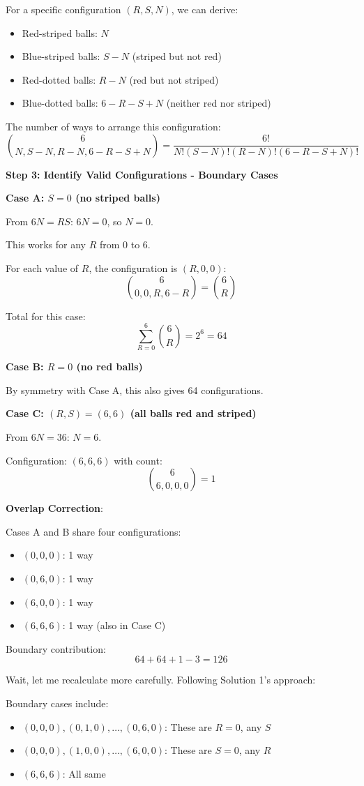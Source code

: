 \documentclass[12pt]{article}
\begin{document}
\begin{solutionbox}
For a specific configuration $(R, S, N)$, we can derive:
\begin{itemize}
    \item Red-striped balls: $N$
    \item Blue-striped balls: $S - N$ (striped but not red)
    \item Red-dotted balls: $R - N$ (red but not striped)
    \item Blue-dotted balls: $6 - R - S + N$ (neither red nor striped)
\end{itemize}

The number of ways to arrange this configuration:
$$\binom{6}{N, S-N, R-N, 6-R-S+N} = \frac{6!}{N! (S-N)! (R-N)! (6-R-S+N)!}$$

\textbf{Step 3: Identify Valid Configurations - Boundary Cases}

\textbf{Case A: $S = 0$ (no striped balls)}

From $6N = RS$: $6N = 0$, so $N = 0$.

This works for any $R$ from 0 to 6.

For each value of $R$, the configuration is $(R, 0, 0)$:
$$\binom{6}{0,0,R,6-R} = \binom{6}{R}$$

Total for this case:
$$\sum_{R=0}^{6} \binom{6}{R} = 2^6 = 64$$

\textbf{Case B: $R = 0$ (no red balls)}

By symmetry with Case A, this also gives 64 configurations.

\textbf{Case C: $(R, S) = (6, 6)$ (all balls red and striped)}

From $6N = 36$: $N = 6$.

Configuration: $(6, 6, 6)$ with count:
$$\binom{6}{6,0,0,0} = 1$$

\textbf{Overlap Correction}:

Cases A and B share four configurations:
\begin{itemize}
    \item $(0, 0, 0)$: 1 way
    \item $(0, 6, 0)$: 1 way
    \item $(6, 0, 0)$: 1 way
    \item $(6, 6, 6)$: 1 way (also in Case C)
\end{itemize}

Boundary contribution:
$$64 + 64 + 1 - 3 = 126$$

Wait, let me recalculate more carefully. Following Solution 1's approach:

Boundary cases include:
\begin{itemize}
    \item $(0, 0, 0), (0, 1, 0), \ldots, (0, 6, 0)$: These are $R = 0$, any $S$
    \item $(0, 0, 0), (1, 0, 0), \ldots, (6, 0, 0)$: These are $S = 0$, any $R$
    \item $(6, 6, 6)$: All same
\end{itemize}


\end{solutionbox}
\end{document}
